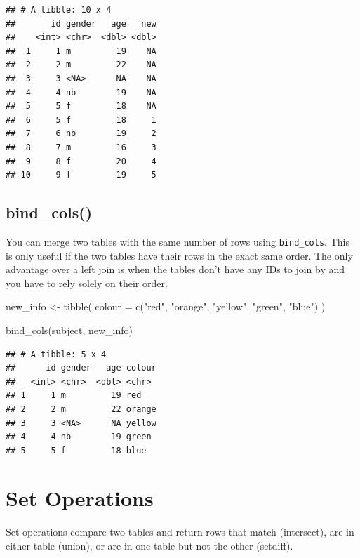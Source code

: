 \documentclass[
  oneside]{book}
\newenvironment{Shaded}{\begin{snugshade}}{\end{snugshade}}
\newcommand{\AttributeTok}[1]{\textcolor[rgb]{0.77,0.63,0.00}{#1}}
\newcommand{\FunctionTok}[1]{\textcolor[rgb]{0.00,0.00,0.00}{#1}}
\newcommand{\NormalTok}[1]{#1}
\newcommand{\OtherTok}[1]{\textcolor[rgb]{0.56,0.35,0.01}{#1}}
\newcommand{\StringTok}[1]{\textcolor[rgb]{0.31,0.60,0.02}{#1}}
\begin{document}
\begin{verbatim}
## # A tibble: 10 x 4
##       id gender   age   new
##    <int> <chr>  <dbl> <dbl>
##  1     1 m         19    NA
##  2     2 m         22    NA
##  3     3 <NA>      NA    NA
##  4     4 nb        19    NA
##  5     5 f         18    NA
##  6     5 f         18     1
##  7     6 nb        19     2
##  8     7 m         16     3
##  9     8 f         20     4
## 10     9 f         19     5
\end{verbatim}

\hypertarget{bind_cols}{%
\subsection{bind\_cols()}\label{bind_cols}}

You can merge two tables with the same number of rows using \texttt{bind\_cols}. This is only useful if the two tables have their rows in the exact same order. The only advantage over a left join is when the tables don't have any IDs to join by and you have to rely solely on their order.

\begin{Shaded}
\begin{Highlighting}[]
\NormalTok{new\_info }\OtherTok{\textless{}{-}} \FunctionTok{tibble}\NormalTok{(}
  \AttributeTok{colour =} \FunctionTok{c}\NormalTok{(}\StringTok{"red"}\NormalTok{, }\StringTok{"orange"}\NormalTok{, }\StringTok{"yellow"}\NormalTok{, }\StringTok{"green"}\NormalTok{, }\StringTok{"blue"}\NormalTok{)}
\NormalTok{)}

\FunctionTok{bind\_cols}\NormalTok{(subject, new\_info)}
\end{Highlighting}
\end{Shaded}

\begin{verbatim}
## # A tibble: 5 x 4
##      id gender   age colour
##   <int> <chr>  <dbl> <chr> 
## 1     1 m         19 red   
## 2     2 m         22 orange
## 3     3 <NA>      NA yellow
## 4     4 nb        19 green 
## 5     5 f         18 blue
\end{verbatim}

\hypertarget{set-operations}{%
\section{Set Operations}\label{set-operations}}

Set operations compare two tables and return rows that match (intersect), are in either table (union), or are in one table but not the other (setdiff).
\end{document}
